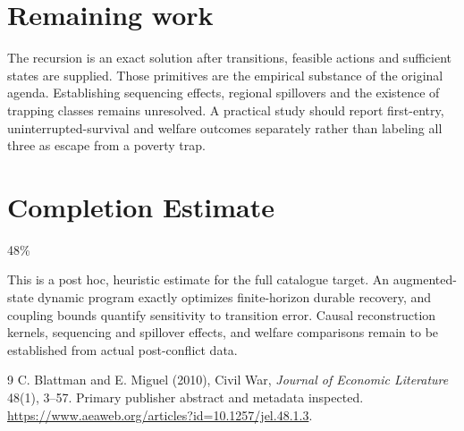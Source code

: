 \documentclass[11pt]{article}
\begin{document}
\section*{Remaining work}
The recursion is an exact solution after transitions, feasible actions and sufficient states are supplied. Those primitives are the empirical substance of the original agenda. Establishing sequencing effects, regional spillovers and the existence of trapping classes remains unresolved. A practical study should report first-entry, uninterrupted-survival and welfare outcomes separately rather than labeling all three as escape from a poverty trap.

\section{Completion Estimate}
48\%

This is a post hoc, heuristic estimate for the full catalogue target.
An augmented-state dynamic program exactly optimizes finite-horizon durable recovery, and coupling bounds quantify sensitivity to transition error. Causal reconstruction kernels, sequencing and spillover effects, and welfare comparisons remain to be established from actual post-conflict data.

\begin{thebibliography}{9}
 C. Blattman and E. Miguel (2010), Civil War, \emph{Journal of Economic Literature} 48(1), 3--57. Primary publisher abstract and metadata inspected. \url{https://www.aeaweb.org/articles?id=10.1257/jel.48.1.3}.
\end{thebibliography}
\end{document}

